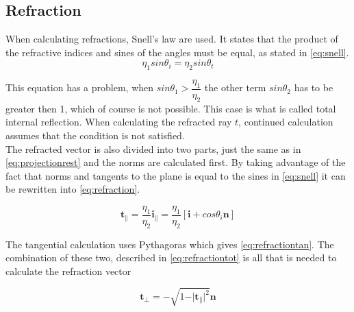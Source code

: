 \documentclass[a4paper, 12pt]{report}
\begin{document}

\subsection{Refraction}
When calculating refractions, Snell's law are used. 
It states that the product of the refractive indices and sines of the angles must be equal, as stated in \autoref{eq:snell}.\\

\begin{equation} \label{eq:snell}
\eta_1 sin \theta_i = \eta_2 sin \theta_t
\end{equation}

This equation has a problem, when $ sin \theta_1 > \dfrac{\eta_1}{\eta_2} $
the other term $ sin \theta_2 $ has to be greater then 1, which of course is not possible.
This case is what is called total internal reflection.
When calculating the refracted ray $ t $, continued calculation assumes that the condition is not satisfied.\\

The refracted vector is also divided into two parts, just the same as in \autoref{eq:projectionrest} and the norms are calculated first. 
By taking advantage of the fact that norms and tangents to the plane is equal to the sines in \autoref{eq:snell} it can be rewritten into \autoref{eq:refraction}.

\begin{equation} \label{eq:refraction}
\mathbf{t}_\| = \frac{\eta_1}{\eta_2} \mathbf{i}_\| = \frac{\eta_1}{\eta_2} 
[\mathbf{i} + cos \theta_i \mathbf{n}]
\end{equation}

The tangential calculation uses Pythagoras which gives \autoref{eq:refractiontan}. 
The combination of these two, described in \autoref{eq:refractiontot} is all that is needed to calculate the refraction vector 

\begin{equation} \label{eq:refractiontan}
\mathbf{t}_\bot = - \sqrt{1 - \vert \mathbf{t}_\| \vert ^2}\mathbf{n}
\end{equation}
\end{document}
